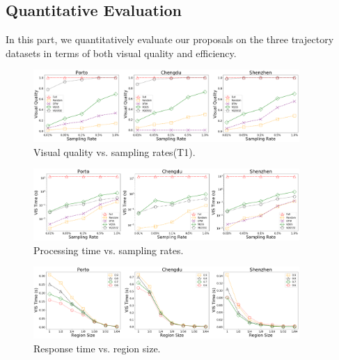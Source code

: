 \subsection{Quantitative Evaluation}\label{sec:quality}
In this part, we quantitatively evaluate our proposals on the three trajectory datasets in terms of both visual quality and efficiency.

\begin{figure}[t]
	\centering
	\includegraphics[width=0.9\textwidth]{pictures/quantitative_study_icde/rate_quality.png}
	\caption{Visual quality vs. sampling rates(T1).}
	\label{fig:sample_quality}
\end{figure}

\begin{figure}[t]
	\centering
	\includegraphics[width=0.9\textwidth]{pictures/quantitative_study_icde/rate_rendertime.png}
	\caption{Processing time vs. sampling rates.}
	\label{fig:rate_quality}
\end{figure}


\begin{figure}[t]
	\centering
	\includegraphics[width=0.9\textwidth]{pictures/quantitative_study_icde/size_rendertime.png}
	\caption{Response time vs. region size.}
	\label{fig:size_rendertime}
\end{figure}



